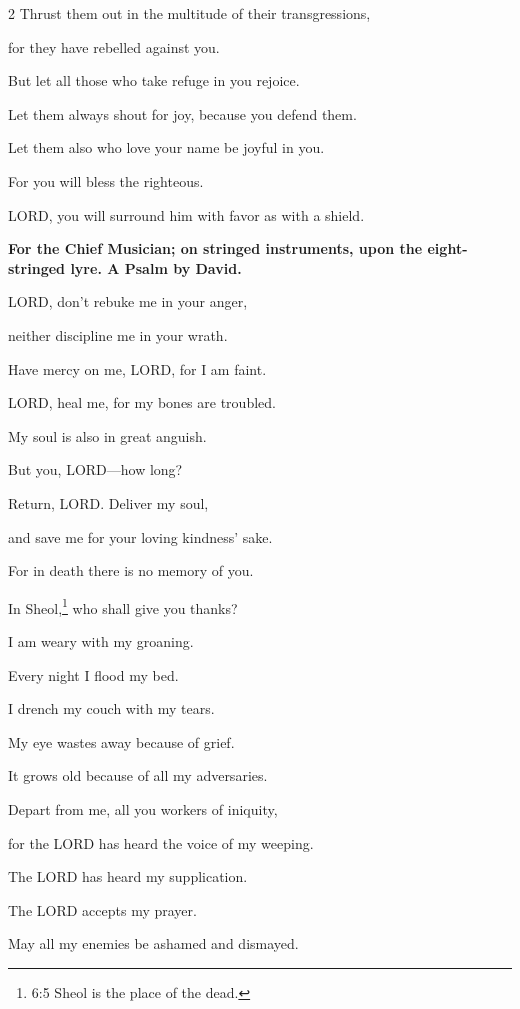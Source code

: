 \begin{multicols}{2}
	Thrust them out in the multitude of their transgressions,
	
	for they have rebelled against you.
	
	
	\myverse{}But let all those who take refuge in you rejoice.
	
	Let them always shout for joy, because you defend them.
	
	Let them also who love your name be joyful in you.
	
	
	\myverse{}For you will bless the righteous.
	
	LORD, you will surround him with favor as with a shield.
	
	
	\mychapter{}\textbf{For the Chief Musician; on stringed instruments, upon the eight-stringed lyre. A Psalm by David.}
	
	\myverse*{}LORD, don’t rebuke me in your anger,
	
	neither discipline me in your wrath.
	
	
	\myverse{}Have mercy on me, LORD, for I am faint.
	
	LORD, heal me, for my bones are troubled.
	
	
	\myverse{}My soul is also in great anguish.
	
	But you, LORD---how long?
	
	
	\myverse{}Return, LORD. Deliver my soul,
	
	and save me for your loving kindness’ sake.
	
	
	\myverse{}For in death there is no memory of you.
	
	In Sheol,\footnote{6:5 Sheol is the place of the dead.} who shall give you thanks?
	
	
	\myverse{}I am weary with my groaning.
	
	Every night I flood my bed.
	
	I drench my couch with my tears.
	
	
	\myverse{}My eye wastes away because of grief.
	
	It grows old because of all my adversaries.
	
	
	\myverse{}Depart from me, all you workers of iniquity,
	
	for the LORD has heard the voice of my weeping.
	
	
	\myverse{}The LORD has heard my supplication.
	
	The LORD accepts my prayer.
	
	
	\myverse{}May all my enemies be ashamed and dismayed.
	

\end{multicols}
